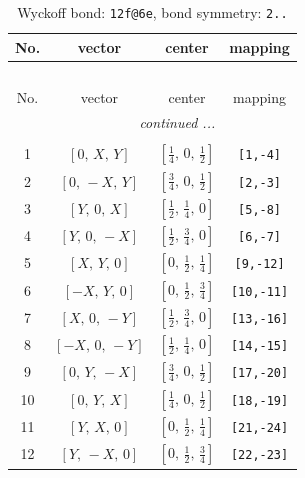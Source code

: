 \documentclass[fleqn,8pt]{jsarticle}
\begin{document}
\renewcommand{\arraystretch}{1.2}
\begin{longtable}{cccc}
\caption{Wyckoff bond: {\tt 12f@6e}, bond symmetry: {\tt 2..}}
 \\
 \hline \hline
No. & vector & center & mapping \\ \hline \endfirsthead

\multicolumn{3}{l}{\tablename\ \thetable{}} \\
 \hline \hline
No. & vector & center & mapping \\ \hline \endhead

 \hline \hline
\multicolumn{3}{r}{\footnotesize\it continued ...} \\ \endfoot

 \hline \hline
\multicolumn{3}{r}{} \\ \endlastfoot

1 & $\left[ 0,\, X,\, Y \right]$ & $\left[ \frac{1}{4},\, 0,\, \frac{1}{2} \right]$ & {\tt [1,-4]} \\ \hline
2 & $\left[ 0,\, - X,\, Y \right]$ & $\left[ \frac{3}{4},\, 0,\, \frac{1}{2} \right]$ & {\tt [2,-3]} \\ \hline
3 & $\left[ Y,\, 0,\, X \right]$ & $\left[ \frac{1}{2},\, \frac{1}{4},\, 0 \right]$ & {\tt [5,-8]} \\ \hline
4 & $\left[ Y,\, 0,\, - X \right]$ & $\left[ \frac{1}{2},\, \frac{3}{4},\, 0 \right]$ & {\tt [6,-7]} \\ \hline
5 & $\left[ X,\, Y,\, 0 \right]$ & $\left[ 0,\, \frac{1}{2},\, \frac{1}{4} \right]$ & {\tt [9,-12]} \\ \hline
6 & $\left[ - X,\, Y,\, 0 \right]$ & $\left[ 0,\, \frac{1}{2},\, \frac{3}{4} \right]$ & {\tt [10,-11]} \\ \hline
7 & $\left[ X,\, 0,\, - Y \right]$ & $\left[ \frac{1}{2},\, \frac{3}{4},\, 0 \right]$ & {\tt [13,-16]} \\ \hline
8 & $\left[ - X,\, 0,\, - Y \right]$ & $\left[ \frac{1}{2},\, \frac{1}{4},\, 0 \right]$ & {\tt [14,-15]} \\ \hline
9 & $\left[ 0,\, Y,\, - X \right]$ & $\left[ \frac{3}{4},\, 0,\, \frac{1}{2} \right]$ & {\tt [17,-20]} \\ \hline
10 & $\left[ 0,\, Y,\, X \right]$ & $\left[ \frac{1}{4},\, 0,\, \frac{1}{2} \right]$ & {\tt [18,-19]} \\ \hline
11 & $\left[ Y,\, X,\, 0 \right]$ & $\left[ 0,\, \frac{1}{2},\, \frac{1}{4} \right]$ & {\tt [21,-24]} \\ \hline
12 & $\left[ Y,\, - X,\, 0 \right]$ & $\left[ 0,\, \frac{1}{2},\, \frac{3}{4} \right]$ & {\tt [22,-23]} \\
\end{longtable}
\end{document}
